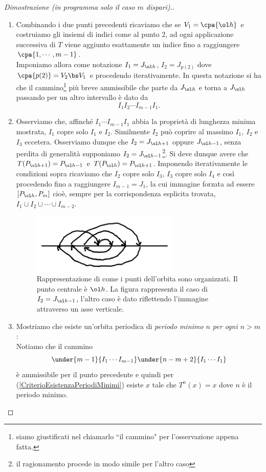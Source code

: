 \begin{proof}[Dimostrazione (in programma solo il caso $m$ dispari).]
\begin{enumerate}
\item Combinando i due punti precedenti ricaviamo che se $V_1=\cpa{\ol h}$ e costruiamo gli insiemi di indici come al punto 2, ad ogni applicazione successiva di $T$ viene aggiunto esattamente un indice fino a raggiungere $\cpa{1,\cdots, m-1}$.\\
Imponiamo allora come notazione $I_1=J_{\ol h}$, $I_2=J_{p(2)}$ dove $\cpa{p(2)}=V_2\bs V_1$ e procedendo iterativamente. In questa notazione si ha che il cammino\footnote{siamo giustificati nel chiamarlo ``il cammino" per l'osservazione appena fatta.} pi\`u breve ammissibile che parte da $J_{\ol h}$ e torna a $J_{\ol h}$ passando per un altro intervallo \`e dato da
\[I_1I_2\cdots I_{m-1}I_1.\]

\item Osserviamo che, affinch\'e $I_1\cdots I_{m-1}I_1$ abbia la propriet\`a di lunghezza minima mostrata, $I_1$ copre solo $I_1$ e $I_2$. Similmente $I_2$ pu\`o coprire al massimo $I_1,\ I_2$ e $I_3$ eccetera. Osserviamo dunque che $I_2=J_{\ol h+1}$ oppure $J_{\ol h-1}$, senza perdita di generalit\`a supponiamo $I_2=J_{\ol h-1}$\footnote{il ragionamento procede in modo simile per l'altro caso}. Si deve dunque avere che $T(P_{\ol h+1})=P_{\ol h-1}$ e $T(P_{\ol h})=P_{\ol h+1}$. Imponendo iterativamente le condizioni sopra ricaviamo che $I_2$ copre solo $I_3$, $I_3$ copre solo $I_4$ e cos\`i procedendo fino a raggiungere $I_{m-1}=J_{1}$, la cui immagine forzata ad essere $[P_{\ol h},P_m]$ cio\`e, sempre per la corrispondenza esplicita trovata, $I_1\cup I_2\cup \cdots\cup I_{m-2}$.
\begin{figure}[!htb]
	\centering
	\includegraphics[width=7cm]{Immagini/Disegno_A.png}
	\caption{Rappresentazione di come i punti dell'orbita sono organizzati. Il punto centrale \`e $\ol h$. La figura rappresenta il caso di $I_2=J_{\ol h-1}$, l'altro caso \`e dato riflettendo l'immagine attraverso un asse verticale.}
	\label{ConfigurazioneOrbita}
\end{figure}

\item Mostriamo che esiste un'orbita periodica di \textit{periodo minimo $n$ per ogni $n>m$}:\\
Notiamo che il cammino
\[\under{m-1}{I_1\cdots I_{m-1}}\under{n-m+2}{I_1\cdots I_1}\]
\`e ammissibile per il punto precedente e quindi per (\ref{CriterioEsistenzaPeriodiMinimi}) esiste $x$ tale che $T^{n}(x)=x$ dove $n$ \`e il periodo minimo.


\end{enumerate}
\end{proof}
